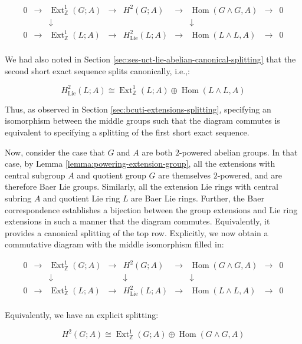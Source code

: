 $$\begin{array}{ccccccccc}
  0 &\to &\operatorname{Ext}^1_{\mathbb{Z}}(G;A) &\to &H^2(G;A) &\to &\operatorname{Hom}(G \wedge G,A) &\to &0\\
  & & \downarrow & & & & \downarrow & & \\
  0 &\to &\operatorname{Ext}^1_{\mathbb{Z}}(L;A) & \to & H^2_{\text{Lie}}(L;A) & \to & \operatorname{Hom}(L \wedge L, A) & \to & 0\\
\end{array}$$
 
We had also noted in Section
\ref{sec:ses-uct-lie-abelian-canonical-splitting} that the second
short exact sequence splits canonically, i.e.,:

$$H^2_{\text{Lie}}(L;A) \cong \operatorname{Ext}^1_{\mathbb{Z}}(L;A) \oplus \operatorname{Hom}(L \wedge L, A)$$

Thus, as observed in Section \ref{sec:bcuti-extensions-splitting},
specifying an isomorphism between the middle groups such that the
diagram commutes is equivalent to specifying a splitting of the first
short exact sequence.

Now, consider the case that $G$ and $A$ are both $2$-powered abelian
groups. In that case, by Lemma \ref{lemma:powering-extension-group},
all the extensions with central subgroup $A$ and quotient group $G$
are themselves $2$-powered, and are therefore Baer Lie
groups. Similarly, all the extension Lie rings with central subring
$A$ and quotient Lie ring $L$ are Baer Lie rings. Further, the Baer
correspondence establishes a bijection between the group extensions
and Lie ring extensions in such a manner that the diagram
commutes. Equivalently, it provides a canonical splitting of the top
row. Explicitly, we now obtain a commutative diagram with the middle
isomorphism filled in:

$$\begin{array}{ccccccccc}
  0 &\to &\operatorname{Ext}^1_{\mathbb{Z}}(G;A) &\to &H^2(G;A) &\to &\operatorname{Hom}(G \wedge G,A) &\to &0\\
  & & \downarrow & & \downarrow & & \downarrow & & \\
  0 &\to &\operatorname{Ext}^1_{\mathbb{Z}}(L;A) & \to & H^2_{\text{Lie}}(L;A) & \to & \operatorname{Hom}(L \wedge L, A) & \to & 0\\
\end{array}$$

Equivalently, we have an explicit splitting:

$$H^2(G;A) \cong \operatorname{Ext}^1_{\mathbb{Z}}(G;A) \oplus \operatorname{Hom}(G \wedge G,A)$$

